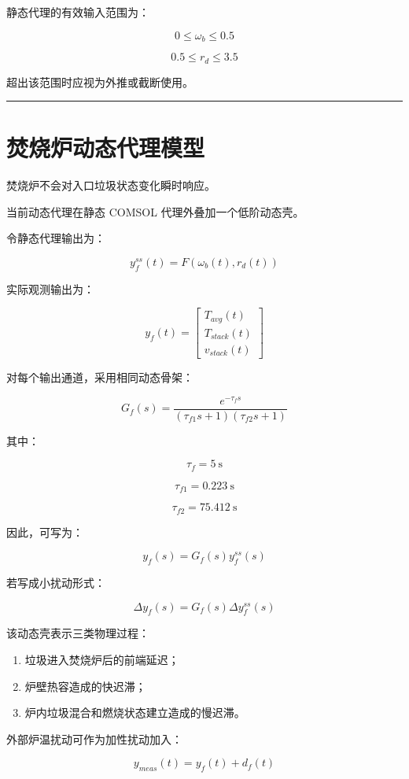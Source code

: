 \documentclass[UTF8,openany,zihao=-4,oneside]{ctexbook}
\providecommand{\tightlist}{\setlength{\itemsep}{0pt}\setlength{\parskip}{0pt}}
\newcommand{\manualdivider}{\par\vspace{0.6em}\noindent\textcolor{FGLine}{\rule{\linewidth}{0.7pt}}\vspace{0.6em}\par}
\begin{document}
静态代理的有效输入范围为：

\[
0\le\omega_b\le0.5
\]

\[
0.5\le r_d\le3.5
\]

超出该范围时应视为外推或截断使用。

\manualdivider

\section{焚烧炉动态代理模型}\label{ux711aux70e7ux7089ux52a8ux6001ux4ee3ux7406ux6a21ux578b}

焚烧炉不会对入口垃圾状态变化瞬时响应。

当前动态代理在静态 COMSOL 代理外叠加一个低阶动态壳。

令静态代理输出为：

\[
y_f^{ss}(t)=F(\omega_b(t),r_d(t))
\]

实际观测输出为：

\[
y_f(t)=\begin{bmatrix}T_{avg}(t)\\T_{stack}(t)\\ v_{stack}(t)
\end{bmatrix}
\]

对每个输出通道，采用相同动态骨架：

\[
G_f(s)=\frac{e^{-\tau_fs}}{(\tau_{f1}s+1)(\tau_{f2}s+1)}
\]

其中：

\[
\tau_f=5\ \mathrm{s}
\]

\[
\tau_{f1}=0.223\ \mathrm{s}
\]

\[
\tau_{f2}=75.412\ \mathrm{s}
\]

因此，可写为：

\[
y_f(s)=G_f(s)y_f^{ss}(s)
\]

若写成小扰动形式：

\[
\Delta y_f(s)=G_f(s)\Delta y_f^{ss}(s)
\]

该动态壳表示三类物理过程：

\begin{enumerate}
\def\labelenumi{\arabic{enumi}.}
\tightlist
\item
  垃圾进入焚烧炉后的前端延迟；
\item
  炉壁热容造成的快迟滞；
\item
  炉内垃圾混合和燃烧状态建立造成的慢迟滞。
\end{enumerate}

外部炉温扰动可作为加性扰动加入：

\[
y_{meas}(t)=y_f(t)+d_f(t)
\]
\end{document}
